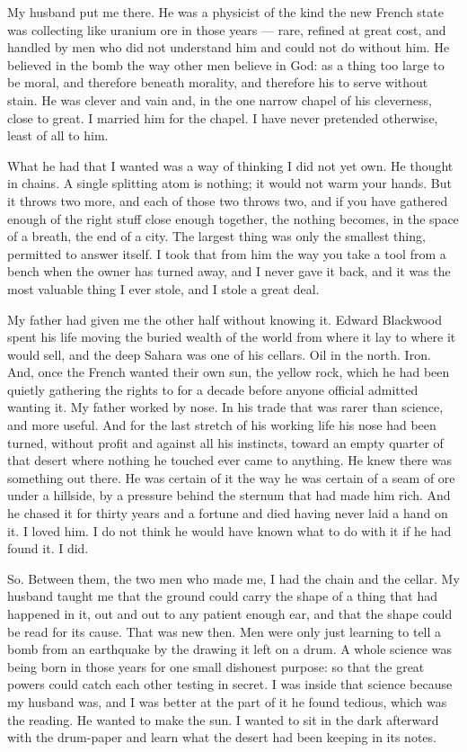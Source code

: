 My husband put me there. He was a physicist of the kind the new French state was collecting like uranium ore in those years --- rare, refined at great cost, and handled by men who did not understand him and could not do without him. He believed in the bomb the way other men believe in God: as a thing too large to be moral, and therefore beneath morality, and therefore his to serve without stain. He was clever and vain and, in the one narrow chapel of his cleverness, close to great. I married him for the chapel. I have never pretended otherwise, least of all to him.\par

What he had that I wanted was a way of thinking I did not yet own. He thought in chains. A single splitting atom is nothing; it would not warm your hands. But it throws two more, and each of those two throws two, and if you have gathered enough of the right stuff close enough together, the nothing becomes, in the space of a breath, the end of a city. The largest thing was only the smallest thing, permitted to answer itself. I took that from him the way you take a tool from a bench when the owner has turned away, and I never gave it back, and it was the most valuable thing I ever stole, and I stole a great deal.\par

My father had given me the other half without knowing it. Edward Blackwood spent his life moving the buried wealth of the world from where it lay to where it would sell, and the deep Sahara was one of his cellars. Oil in the north. Iron. And, once the French wanted their own sun, the yellow rock, which he had been quietly gathering the rights to for a decade before anyone official admitted wanting it. My father worked by nose. In his trade that was rarer than science, and more useful. And for the last stretch of his working life his nose had been turned, without profit and against all his instincts, toward an empty quarter of that desert where nothing he touched ever came to anything. He knew there was something out there. He was certain of it the way he was certain of a seam of ore under a hillside, by a pressure behind the sternum that had made him rich. And he chased it for thirty years and a fortune and died having never laid a hand on it. I loved him. I do not think he would have known what to do with it if he had found it. I did.\par

So. Between them, the two men who made me, I had the chain and the cellar. My husband taught me that the ground could carry the shape of a thing that had happened in it, out and out to any patient enough ear, and that the shape could be read for its cause. That was new then. Men were only just learning to tell a bomb from an earthquake by the drawing it left on a drum. A whole science was being born in those years for one small dishonest purpose: so that the great powers could catch each other testing in secret. I was inside that science because my husband was, and I was better at the part of it he found tedious, which was the reading. He wanted to make the sun. I wanted to sit in the dark afterward with the drum-paper and learn what the desert had been keeping in its notes.\par

